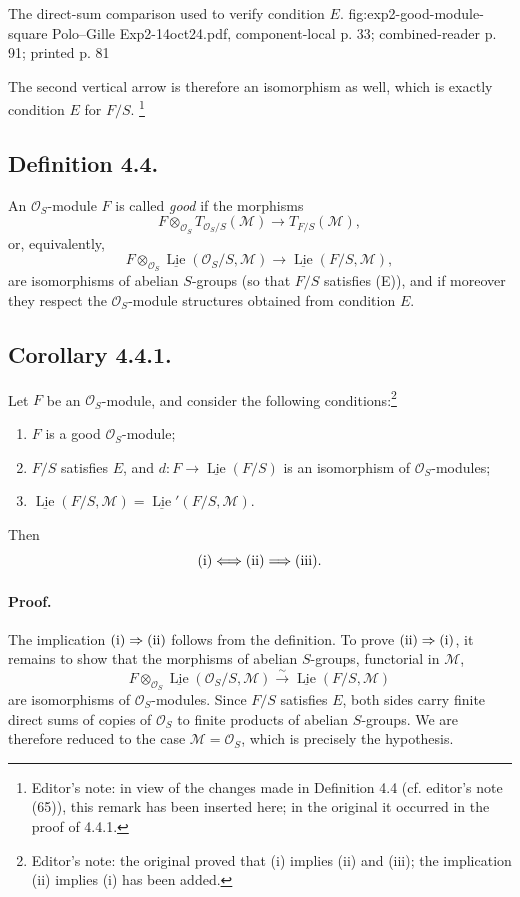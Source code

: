   {The direct-sum comparison used to verify condition \(E\).}
  {fig:exp2-good-module-square}
  {Polo--Gille Exp2-14oct24.pdf, component-local p. 33; combined-reader p. 91; printed p. 81}

The second vertical arrow is therefore an isomorphism as well, which is
exactly condition \(E\) for \(F/S\).
\footnote{Editor's note: in view of the changes made in Definition 4.4
(cf. editor's note (65)), this remark has been inserted here; in the
original it occurred in the proof of 4.4.1.}

\subsection*{Definition 4.4.}
An \(\mathcal O_S\)-module \(F\) is called \emph{good} if the morphisms
\[
 F\otimes_{\mathcal O_S}T_{\mathcal O_S/S}(\mathcal M)
 \longrightarrow T_{F/S}(\mathcal M),
\]
or, equivalently,
\[
 F\otimes_{\mathcal O_S}
 \underline{\operatorname{Lie}}(\mathcal O_S/S,\mathcal M)
 \longrightarrow
 \underline{\operatorname{Lie}}(F/S,\mathcal M),
\]
are isomorphisms of abelian \(S\)-groups (so that \(F/S\) satisfies
(E)), and if moreover they respect the \(\mathcal O_S\)-module
structures obtained from condition \(E\).

\subsection*{Corollary 4.4.1.}
Let \(F\) be an \(\mathcal O_S\)-module, and consider the following
conditions:\footnote{Editor's note: the original proved that (i) implies
(ii) and (iii); the implication (ii) implies (i) has been added.}
\begin{enumerate}
  \item[(i)] \(F\) is a good \(\mathcal O_S\)-module;
  \item[(ii)] \(F/S\) satisfies \(E\), and
    \(d:F\to\underline{\operatorname{Lie}}(F/S)\) is an isomorphism of
    \(\mathcal O_S\)-modules;
  \item[(iii)]
    \(\underline{\operatorname{Lie}}(F/S,\mathcal M)
      =\underline{\operatorname{Lie}}'(F/S,\mathcal M)\).
\end{enumerate}
Then
\[
  \textup{(i)}\Longleftrightarrow\textup{(ii)}
  \Longrightarrow\textup{(iii)}.
\]

\paragraph{Proof.}
The implication
\(\textup{(i)}\Rightarrow\textup{(ii)}\) follows from the definition. To
prove \(\textup{(ii)}\Rightarrow\textup{(i)}\), it remains to show that
the morphisms of
abelian \(S\)-groups, functorial in \(\mathcal M\),
\[
 F\otimes_{\mathcal O_S}
 \underline{\operatorname{Lie}}(\mathcal O_S/S,\mathcal M)
 \xrightarrow{\sim}
 \underline{\operatorname{Lie}}(F/S,\mathcal M)
\]
are isomorphisms of \(\mathcal O_S\)-modules. Since \(F/S\) satisfies
\(E\), both sides carry finite direct sums of copies of \(\mathcal O_S\)
to finite products of abelian \(S\)-groups. We are therefore reduced to
the case \(\mathcal M=\mathcal O_S\), which is precisely the hypothesis.

